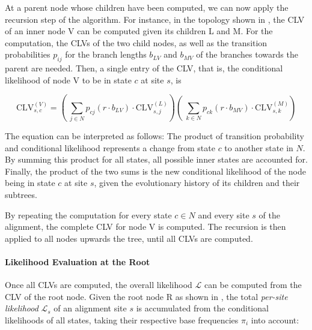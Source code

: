 At a parent node whose children have been computed, we can now apply the recursion step of the algorithm.
For instance, in the topology shown in , the CLV of an inner node {\sffamily V}
can be computed given its children {\sffamily L} and {\sffamily M}.
For the computation, the CLVs of the two child nodes,
as well as the transition probabilities $p_{ij}$ for the branch lengths $b_{LV}$ and $b_{MV}$
of the branches towards the parent are needed.
Then, a single entry of the CLV, that is,
the conditional likelihood of node {\sffamily V} to be in state $c$ at site $s$, is

\begin{equation}
    \label{ch:Foundations:sec:MLTreeInference:eq:CLV}
    \mbox{CLV}^{(V)}_{s,c} =
    \left(~ \sum_{j \in N} p_{cj}(r \cdot b_{LV}) \cdot \mbox{CLV}^{(L)}_{s,j} \right)
    \left(~ \sum_{k \in N} p_{ck}(r \cdot b_{MV}) \cdot \mbox{CLV}^{(M)}_{s,k} \right)
\end{equation}

The equation can be interpreted as follows:
The product of transition probability and conditional likelihood represents a change from state $c$ to another state in $N$.
By summing this product for all states, all possible inner states are accounted for.
Finally, the product of the two sums is the new conditional likelihood of the node being in state $c$ at site $s$,
given the evolutionary history of its children and their subtrees.

By repeating the computation for every state $c \in N$ and every site $s$ of the alignment,
the complete CLV for node {\sffamily V} is computed.
The recursion is then applied to all nodes upwards the tree, until all CLVs are computed.

\paragraph{Likelihood Evaluation at the Root}
\label{ch:Foundations:sec:MLTreeInference:sub:LikelihoodComputations:par:RootLikelihood}

Once all CLVs are computed, the overall likelihood $\mathcal{L}$ can be computed from the CLV of the root node.
Given the root node {\sffamily R} as shown in ,
the total \emph{per-site likelihood} $\mathcal{L}_s$ of an alignment site $s$ is
accumulated from the conditional likelihoods of all states,
taking their respective base frequencies $\pi_i$ into account:

